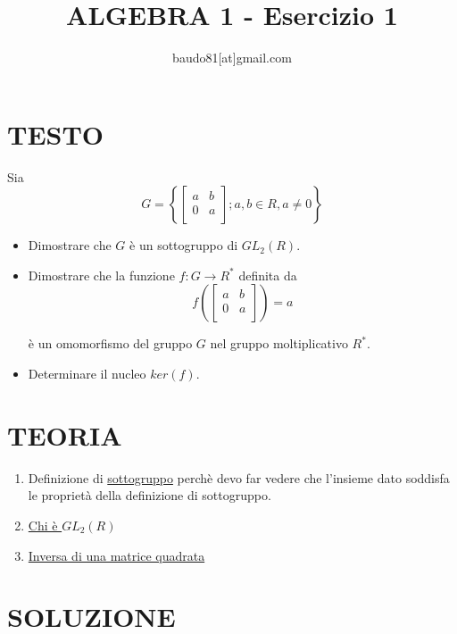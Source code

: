 \documentclass[a4paper,10pt]{article}
\title{ALGEBRA 1 - Esercizio 1}
\author{baudo81[at]gmail.com}
\begin{document}
\maketitle

\section{TESTO}
Sia  
\[
  G = \left\{ \left[ {\begin{array}{cc}
   a & b \\
   0 & a \\    
   \end{array} } 
   \right] ; a, b \in R, a \ne 0 \right\} 
\]

\begin{itemize}
 \item Dimostrare che $G$ è un sottogruppo di $GL_{2}(R)$.
 \item Dimostrare che la funzione $f:G\longrightarrow R^{*}$ definita da \[
  f \left( \left[ {\begin{array}{cc}
   a & b \\
   0 & a \\    
   \end{array} } 
   \right] \right) = a
\]
 
è un omomorfismo del gruppo $G$ nel gruppo moltiplicativo $R^{*}$.

\item Determinare il nucleo $ker(f)$.

\end{itemize}



\section{TEORIA}

\begin{enumerate}
 \item Definizione di \href{./sottogruppo.html}{sottogruppo} perchè devo far vedere che l'insieme dato soddisfa le proprietà della definizione di sottogruppo.
 \item \href{./GL.html}{Chi è $GL_{2}(R)$}
 \item \href{./MatriceInvertibile.html}{Inversa di una matrice quadrata}
\end{enumerate}





\section{SOLUZIONE}
\end{document}
